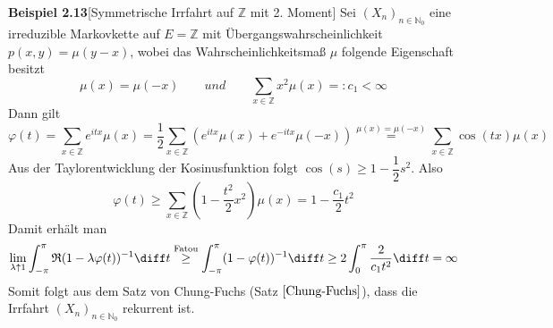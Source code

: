 \textbf{Beispiel 2.13}[Symmetrische Irrfahrt auf $\mathbb{Z}$ mit 2. Moment]
Sei $(X_{n})_{n \in \mathbb{N}_{0}}$ eine irreduzible Markovkette auf $E=\mathbb{Z}$ mit Übergangswahrscheinlichkeit $p(x,y) = \mu (y-x)$, wobei das Wahrscheinlichkeitsmaß $\mu$ folgende Eigenschaft besitzt
\begin{equation*}
\mu (x) = \mu (-x) \qquad und \qquad \sum_{x \in \mathbb{Z}} x^{2} \mu(x) =: c_{1} < \infty
\end{equation*} 
Dann gilt
\begin{equation*}
\varphi(t) = \sum_{x \in \mathbb{Z}} e^{itx} \mu(x) = \dfrac{1}{2} \sum_{x \in \mathbb{Z}} \left( e^{itx} \mu(x) + e^{-itx} \mu(-x)  \right) \stackrel{\mu (x) = \mu (-x)}{=} \sum_{x \in \mathbb{Z}} \cos(tx)\mu(x)
\end{equation*}
Aus der Taylorentwicklung der Kosinusfunktion folgt $\cos(s) \geq 1 - \dfrac{1}{2} s^{2}$. Also
\begin{equation*}
\varphi(t) \geq  \sum_{x \in \mathbb{Z}} \left( 1 - \dfrac{t^{2}}{2} x^{2}\right) \mu(x) = 1 - \dfrac{c_{1}}{2} t^{2}
\end{equation*}
Damit erhält man 
\begin{equation*}
\lim_{\lambda \uparrow 1} \int_{-\pi}^{\pi} \mathfrak{R}(1 - \lambda \varphi(t))^{-1} \diff t \stackrel{\mathrm{Fatou}}{\geq} \int_{-\pi}^{\pi} (1 -  \varphi(t))^{-1} \diff t \geq 2 \int_{0}^{\pi} \dfrac{2}{c_{1} t^{2}} \diff t = \infty
\end{equation*}
Somit folgt aus dem Satz von Chung-Fuchs (Satz $\ref{Chung-Fuchs}$), dass die Irrfahrt $(X_{n})_{n \in \mathbb{N}_{0}}$ rekurrent ist.
